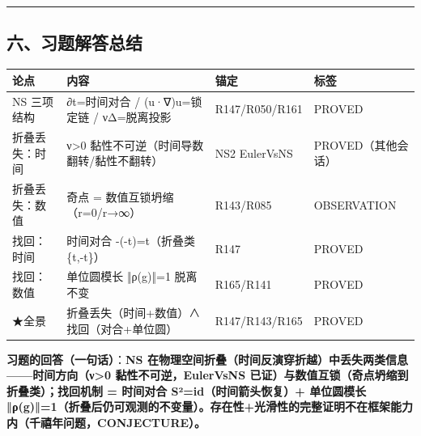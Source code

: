 \documentclass[
]{article}
\newcounter{none} %
\begin{document}
\begin{center}\rule{0.5\linewidth}{0.5pt}\end{center}

\subsection{六、习题解答总结}\label{ux516dux4e60ux9898ux89e3ux7b54ux603bux7ed3}

{\def\LTcaptype{none} %
\begin{longtable}[]{@{}
 >{\raggedright\arraybackslash}p{}
 >{\raggedright\arraybackslash}p{}
 >{\raggedright\arraybackslash}p{}
 >{\raggedright\arraybackslash}p{}@{}}
\toprule\noalign{}
\begin{minipage}[b]{\linewidth}\raggedright
论点
\end{minipage} & \begin{minipage}[b]{\linewidth}\raggedright
内容
\end{minipage} & \begin{minipage}[b]{\linewidth}\raggedright
锚定
\end{minipage} & \begin{minipage}[b]{\linewidth}\raggedright
标签
\end{minipage} \\
\midrule\noalign{}
\endhead
\bottomrule\noalign{}
\endlastfoot
NS 三项结构 & ∂t=时间对合 / (u·∇)u=锁定链 / νΔ=脱离投影 & R147/R050/R161
& PROVED \\
折叠丢失：时间 & ν\textgreater0 黏性不可逆（时间导数翻转/黏性不翻转） &
NS2 EulerVsNS & PROVED（其他会话） \\
折叠丢失：数值 & 奇点 = 数值互锁坍缩（r=0/r→∞） & R143/R085 &
OBSERVATION \\
找回：时间 & 时间对合 -(-t)=t（折叠类 \{t,-t\}） & R147 & PROVED \\
找回：数值 & 单位圆模长 ‖ρ(g)‖=1 脱离不变 & R165/R141 & PROVED \\
★全景 & 折叠丢失（时间+数值）∧ 找回（对合+单位圆） & R147/R143/R165 &
PROVED \\
\end{longtable}
}

\textbf{习题的回答（一句话）}：\textbf{NS
在物理空间折叠（时间反演穿折越）中丢失两类信息------时间方向（ν\textgreater0
黏性不可逆，EulerVsNS 已证）与数值互锁（奇点坍缩到折叠类）；找回机制 =
时间对合 S²=id（时间箭头恢复）+ 单位圆模长
‖ρ(g)‖=1（折叠后仍可观测的不变量）。存在性+光滑性的完整证明不在框架能力内（千禧年问题，CONJECTURE）。}
\end{document}
